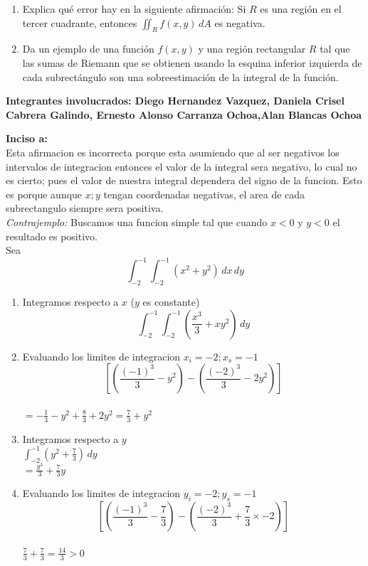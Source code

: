 \begin{ejercicio}
   \begin{enumerate}
    \item[(a)] Explica qué error hay en la siguiente afirmación: Si $R$ es una región en el tercer cuadrante, entonces $\displaystyle\iint_R f(x, y)\, dA$ es negativa.
    \item[(b)] Da un ejemplo de una función $f(x, y)$ y una región rectangular $R$ tal que las sumas de Riemann que se obtienen usando la esquina inferior izquierda de cada subrectángulo son una sobreestimación de la integral de la función.
\end{enumerate}
\end{ejercicio}

\begin{respuesta}
     \textbf{Integrantes involucrados: Diego Hernandez Vazquez, Daniela Crisel Cabrera Galindo, Ernesto Alonso Carranza Ochoa,Alan Blancas Ochoa}
     
     \textbf{Inciso a:}\\Esta afirmacion es incorrecta porque esta asumiendo que al ser negativos los intervalos de integracion entonces el valor de la integral sera negativo, lo cual no es cierto; pues el valor de nuestra integral dependera del signo de la funcion. Esto es porque aunque $x;y$ tengan coordenadas negativas, el area de cada subrectangulo siempre sera positiva.\\
          \textit{Contrajemplo:} Buscamos una funcion simple tal que cuando $x<0$ y $y<0$ el resultado es positivo.\\
          Sea $$\int_{-2}^{-1} \int_{-2}^{-1} (x^2 + y^2)\, dx\, dy$$
          \begin{enumerate}
               \item Integramos respecto a $x$ ($y$ es constante)\\ $$\int_{-2}^{-1} \int_{-2}^{-1} (\frac{x^3}{3} + xy^2)\, dy$$
               \item Evaluando los limites de integracion $x_i = -2; x_s = -1$\\
               $$\left[\left(\frac{(-1)^3}{3} - y^2\right) - \left(\frac{(-2)^3}{3} - 2y^2\right)\right]$$\\
               $ = -\frac{1}{3} - y^2 + \frac{8}{3} + 2y^2 = \frac{7}{3} + y^2$ 
               \item Integramos respecto a $y$\\ 
               $\int_{-2}^{-1} (y^2 + \frac{7}{3})\, dy$\\  
               $= \frac{y^3}{3} + \frac{7}{3}y$ 
               \item Evaluando los limites de integracion $y_i=-2; y_s= -1$\\
               $$\left[\left(\frac{(-1)^3}{3} - \frac{7}{3}\right) - \left(\frac{(-2)^3}{3} + \frac{7}{3}\times -2\right)\right]$$\\
               $\frac{7}{3} + \frac{7}{3} = \frac{14}{3} > 0$
          \end{enumerate}
     

\end{respuesta}
